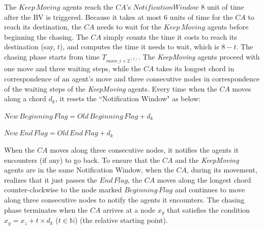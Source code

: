 The $Keep\,Moving$ agents reach the $CA$'s $Notification Window$ 8 unit of time after the BV is triggered. Because it takes at most 6 units of time for the $CA$ to reach its destination, the $CA$ needs to wait  for the $Keep\,Moving$ agents before beginning the chasing. The $CA$ simply counts the time it costs to reach its destination (say,  $t$), and computes the time it needs to wait,  which is $8-t$.
The chasing phase starts from time  $T_{move\_{{i+2}^{(1)}}}$. The {\em KeepMoving} agents proceed with one move and three waiting steps,  while the $CA$ takes its longest chord in correspondence of an agent's move and three consecutive nodes in correspondence of the waiting steps of the {\em KeepMoving} agents. Every time when the $CA$ moves along  a chord $d_k$, it resets the ``Notification Window" as below: 

$New\,Beginning\,Flag=Old\,Beginning\,Flag+d_k$

$New\,End\,Flag=Old\,End\,Flag+d_k$

When the $CA$ moves along three consecutive nodes, it notifies the agents it encounters (if any) to go back. To ensure that the $CA$ and the {\em KeepMoving} agents are in the same  Notification Window,   when the $CA$, during its movement,  realizes that it just passes the $End\,Flag$, the $CA$   moves along the longest chord counter-clockwise to the node marked   $Beginning\,Flag$ and   continues to move   along three consecutive nodes to notify the agents it encounters. The chasing phase terminates when the $CA$ arrives at a  node $x_y$ that  satisfies the condition $x_y=x_z+t\times{d_k}$ ($t\in \mathbb{N}$) (the relative starting point). 

